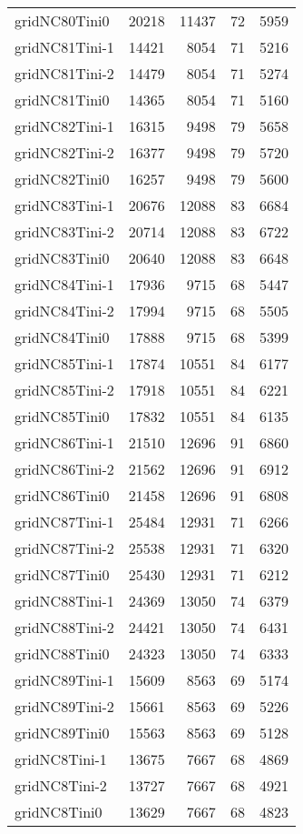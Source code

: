 \documentclass[../../../thesis.tex]{subfiles}
\begin{document}
\begin{longtable}{lrrrr}
gridNC80Tini0 & 20218 & 11437 & 72 & 5959 \\
gridNC81Tini-1 & 14421 & 8054 & 71 & 5216 \\
gridNC81Tini-2 & 14479 & 8054 & 71 & 5274 \\
gridNC81Tini0 & 14365 & 8054 & 71 & 5160 \\
gridNC82Tini-1 & 16315 & 9498 & 79 & 5658 \\
gridNC82Tini-2 & 16377 & 9498 & 79 & 5720 \\
gridNC82Tini0 & 16257 & 9498 & 79 & 5600 \\
gridNC83Tini-1 & 20676 & 12088 & 83 & 6684 \\
gridNC83Tini-2 & 20714 & 12088 & 83 & 6722 \\
gridNC83Tini0 & 20640 & 12088 & 83 & 6648 \\
gridNC84Tini-1 & 17936 & 9715 & 68 & 5447 \\
gridNC84Tini-2 & 17994 & 9715 & 68 & 5505 \\
gridNC84Tini0 & 17888 & 9715 & 68 & 5399 \\
gridNC85Tini-1 & 17874 & 10551 & 84 & 6177 \\
gridNC85Tini-2 & 17918 & 10551 & 84 & 6221 \\
gridNC85Tini0 & 17832 & 10551 & 84 & 6135 \\
gridNC86Tini-1 & 21510 & 12696 & 91 & 6860 \\
gridNC86Tini-2 & 21562 & 12696 & 91 & 6912 \\
gridNC86Tini0 & 21458 & 12696 & 91 & 6808 \\
gridNC87Tini-1 & 25484 & 12931 & 71 & 6266 \\
gridNC87Tini-2 & 25538 & 12931 & 71 & 6320 \\
gridNC87Tini0 & 25430 & 12931 & 71 & 6212 \\
gridNC88Tini-1 & 24369 & 13050 & 74 & 6379 \\
gridNC88Tini-2 & 24421 & 13050 & 74 & 6431 \\
gridNC88Tini0 & 24323 & 13050 & 74 & 6333 \\
gridNC89Tini-1 & 15609 & 8563 & 69 & 5174 \\
gridNC89Tini-2 & 15661 & 8563 & 69 & 5226 \\
gridNC89Tini0 & 15563 & 8563 & 69 & 5128 \\
gridNC8Tini-1 & 13675 & 7667 & 68 & 4869 \\
gridNC8Tini-2 & 13727 & 7667 & 68 & 4921 \\
gridNC8Tini0 & 13629 & 7667 & 68 & 4823 \\

\end{longtable}
\end{document}
